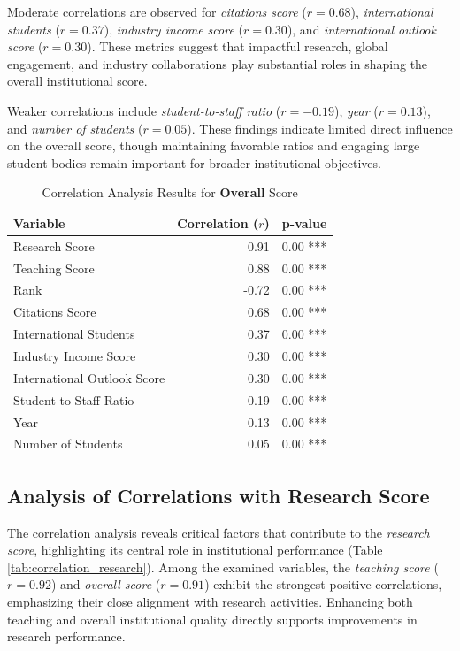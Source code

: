 \documentclass[conference]{IEEEtran}
\begin{document}
Moderate correlations are observed for \textit{citations score} ($r = 0.68$), \textit{international students} ($r = 0.37$), \textit{industry income score} ($r = 0.30$), and \textit{international outlook score} ($r = 0.30$). These metrics suggest that impactful research, global engagement, and industry collaborations play substantial roles in shaping the overall institutional score.

Weaker correlations include \textit{student-to-staff ratio} ($r = -0.19$), \textit{year} ($r = 0.13$), and \textit{number of students} ($r = 0.05$). These findings indicate limited direct influence on the overall score, though maintaining favorable ratios and engaging large student bodies remain important for broader institutional objectives.

\begin{table}[h!]
	\centering
	\caption{Correlation Analysis Results for \textbf{Overall} Score}
	\label{tab:correlation_overall}
	\begin{tabular}{|l|r|r|}
		\hline
		\textbf{Variable} & \textbf{Correlation ($r$)} & \textbf{p-value} \\
		\hline
		Research Score & 0.91 & 0.00 *** \\
		Teaching Score & 0.88 & 0.00 *** \\
		Rank & -0.72 & 0.00 *** \\
		Citations Score & 0.68 & 0.00 *** \\
		International Students & 0.37 & 0.00 *** \\
		Industry Income Score & 0.30 & 0.00 *** \\
		International Outlook Score & 0.30 & 0.00 *** \\
		Student-to-Staff Ratio & -0.19 & 0.00 *** \\
		Year & 0.13 & 0.00 *** \\
		Number of Students & 0.05 & 0.00 *** \\
		\hline
	\end{tabular}
\end{table}



\subsection{Analysis of Correlations with Research Score}

The correlation analysis reveals critical factors that contribute to the \textit{research score}, highlighting its central role in institutional performance (Table \ref{tab:correlation_research}). Among the examined variables, the \textit{teaching score} ($r = 0.92$) and \textit{overall score} ($r = 0.91$) exhibit the strongest positive correlations, emphasizing their close alignment with research activities. Enhancing both teaching and overall institutional quality directly supports improvements in research performance.
\end{document}
